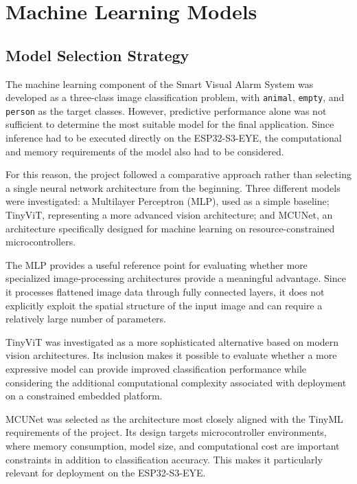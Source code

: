 \documentclass{article}
\begin{document}
\section{Machine Learning Models}
\label{sec:models}

\subsection{Model Selection Strategy}
\label{subsec:model-selection}

The machine learning component of the Smart Visual Alarm System was
developed as a three-class image classification problem, with
\texttt{animal}, \texttt{empty}, and \texttt{person} as the target classes.
However, predictive performance alone was not sufficient to determine the
most suitable model for the final application. Since inference had to be
executed directly on the ESP32-S3-EYE, the computational and memory
requirements of the model also had to be considered.

For this reason, the project followed a comparative approach rather than
selecting a single neural network architecture from the beginning. Three
different models were investigated: a Multilayer Perceptron (MLP), used as
a simple baseline; TinyViT, representing a more advanced vision architecture;
and MCUNet, an architecture specifically designed for machine learning on
resource-constrained microcontrollers.

The MLP provides a useful reference point for evaluating whether more
specialized image-processing architectures provide a meaningful advantage.
Since it processes flattened image data through fully connected layers, it
does not explicitly exploit the spatial structure of the input image and
can require a relatively large number of parameters.

TinyViT was investigated as a more sophisticated alternative based on
modern vision architectures. Its inclusion makes it possible to evaluate
whether a more expressive model can provide improved classification
performance while considering the additional computational complexity
associated with deployment on a constrained embedded platform.

MCUNet was selected as the architecture most closely aligned with the
TinyML requirements of the project. Its design targets microcontroller
environments, where memory consumption, model size, and computational cost
are important constraints in addition to classification accuracy. This
makes it particularly relevant for deployment on the ESP32-S3-EYE.
\end{document}
